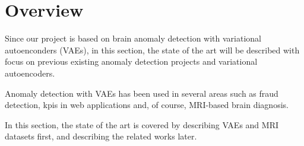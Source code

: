 \section*{Overview}

Since our project is based on brain anomaly detection with variational autoenconders (VAEs), in this section, the state of the art will be described with focus on previous existing anomaly detection projects and variational autoencoders.

Anomaly detection with VAEs has been used in several areas such as fraud detection, \Gls{kpi}s in web applications and, of course, MRI-based brain diagnosis.

In this section, the state of the art is covered by describing VAEs and MRI datasets first, and describing the related works later.